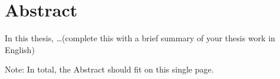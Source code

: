 \section*{Abstract}

In this thesis, \ldots (complete this with a brief summary of your thesis work in English)

%

Note: In total, the Abstract should fit on this single page.
